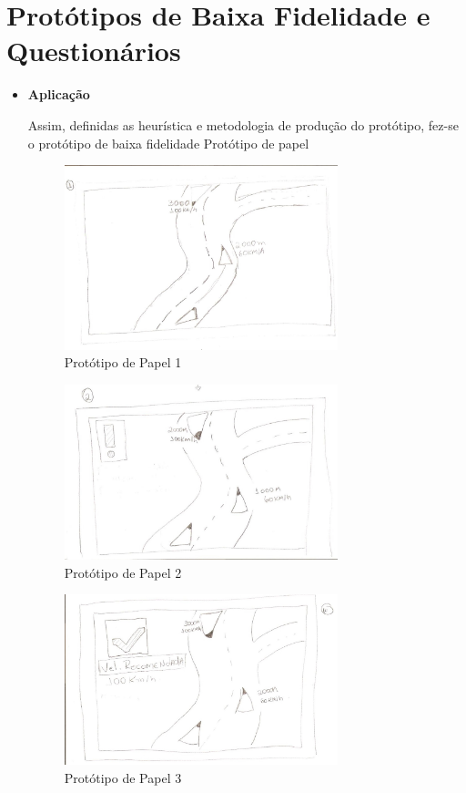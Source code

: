 \chapter{Protótipos de Baixa Fidelidade e Questionários}

\begin{itemize}

\item \textbf{Aplicação}

Assim, definidas as heurística e metodologia de produção do protótipo, fez-se o protótipo de baixa fidelidade
Protótipo de papel

\begin{figure}[h]
  \centering
  \includegraphics[width=300px, scale=1]{figuras/prototipo1}
  \caption{Protótipo de Papel 1}
\label{fig:prototipo1}
\end{figure}

\begin{figure}[h]
  \centering
  \includegraphics[width=300px, scale=1]{figuras/prototipo2}
  \caption{Protótipo de Papel 2}
\label{fig:prototipo2}
\end{figure}

\begin{figure}[h]
  \centering
  \includegraphics[width=300px, scale=1]{figuras/prototipo3}
  \caption{Protótipo de Papel 3}
\label{fig:prototipo3}
\end{figure}


\end{itemize}
